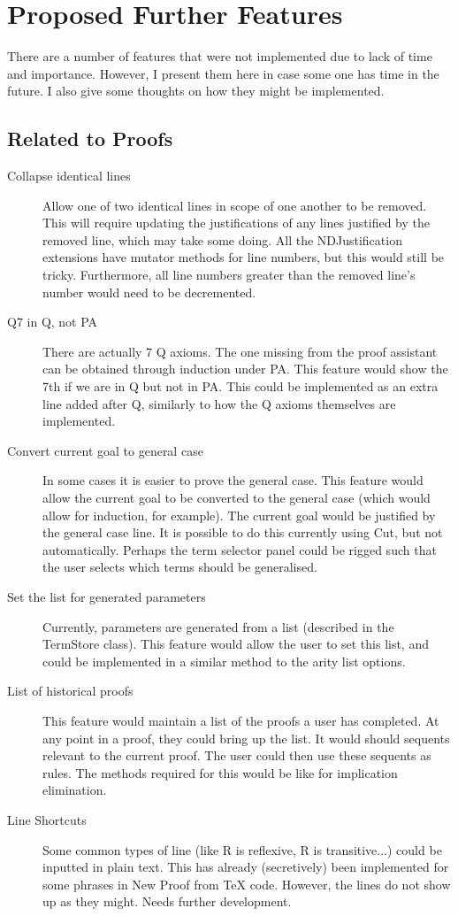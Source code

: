 \documentclass[a4paper]{article}
\begin{document}
\section{Proposed Further Features}
There are a number of features that were not implemented due to lack of time and importance. However, I present them here in case some one has time in the future. I also give some thoughts on how they might be implemented.

\subsection{Related to Proofs}
\begin{description}
	\item[Collapse identical lines] Allow one of two identical lines in scope of one another to be removed. This will require updating the justifications of any lines justified by the removed line, which may take some doing. All the NDJustification extensions have mutator methods for line numbers, but this would still be tricky. Furthermore, all line numbers greater than the removed line's number would need to be decremented.
	\item[Q7 in Q, not PA] There are actually 7 Q axioms. The one missing from the proof assistant can be obtained through induction under PA. This feature would show the 7th if we are in Q but not in PA. This could be implemented as an extra line added after Q, similarly to how the Q axioms themselves are implemented.
	\item[Convert current goal to general case] In some cases it is easier to prove the general case. This feature would allow the current goal to be converted to the general case (which would allow for induction, for example). The current goal would be justified by the general case line. It is possible to do this currently using Cut, but not automatically. Perhaps the term selector panel could be rigged such that the user selects which terms should be generalised.
	\item[Set the list for generated parameters] Currently, parameters are generated from a list (described in the TermStore class). This feature would allow the user to set this list, and could be implemented in a similar method to the arity list options.
	\item[List of historical proofs] This feature would maintain a list of the proofs a user has completed. At any point in a proof, they could bring up the list. It would should sequents relevant to the current proof. The user could then use these sequents as rules. The methods required for this would be like for implication elimination.
	\item[Line Shortcuts] Some common types of line (like R is reflexive, R is transitive...) could be inputted in plain text. This has already (secretively) been implemented for some phrases in New Proof from TeX code. However, the lines do not show up as they might. Needs further development.
\end{description}
\end{document}
